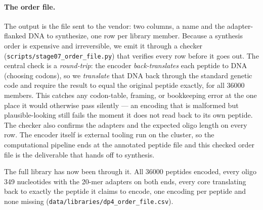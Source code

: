 \paragraph{The order file.} The output is the file sent to the vendor: two columns, a name and the
adapter-flanked DNA to synthesize, one row per library member. Because a synthesis order is expensive
and irreversible, we emit it through a checker (\texttt{scripts/stage07\_order\_file.py}) that verifies
every row before it goes out. The central check is a \emph{round-trip}: the encoder \emph{back-translates}
each peptide to DNA (choosing codons), so we \emph{translate} that DNA back through the standard genetic
code and require the result to equal the original peptide exactly, for all \num{36000} members. This
catches any codon-table, framing, or bookkeeping error at the one place it would otherwise pass silently
--- an encoding that is malformed but plausible-looking still fails the moment it does not read back to
its own peptide. The checker also confirms the adapters and the expected oligo length on every row. The
encoder itself is external tooling run on the cluster, so the computational pipeline ends at the
annotated peptide file and this checked order file is the deliverable that hands off to synthesis.

The full library has now been through it. All \num{36000} peptides encoded, every oligo \num{349}
nucleotides with the \num{20}-mer adapters on both ends, every core translating back to exactly the
peptide it claims to encode, one encoding per peptide and none missing
(\texttt{data/libraries/dp4\_order\_file.csv}).
